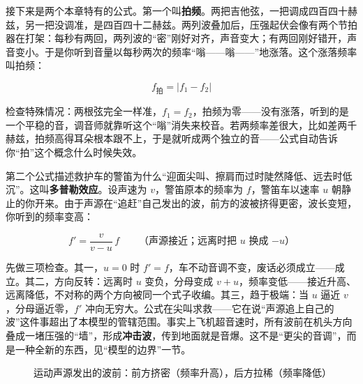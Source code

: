 \begin{mainline}
接下来是两个本章特有的公式。第一个叫\textbf{拍频}。两把吉他弦，一把调成四百四十赫兹，另一把没调准，是四百四十二赫兹。两列波叠加后，压强起伏会像有两个节拍器在打架：每秒有两回，两列波的“密”刚好对齐，声音变大；有两回刚好错开，声音变小。于是你听到音量以每秒两次的频率“嗡——嗡——”地涨落。这个涨落频率叫拍频：

\[
  f_{\text{拍}} = \lvert f_1 - f_2 \rvert
\]

检查特殊情况：两根弦完全一样准，\(f_1=f_2\)，拍频为零——没有涨落，听到的是一个平稳的音，调音师就靠听这个“嗡”消失来校音。若两频率差很大，比如差两千赫兹，拍频高得耳朵根本跟不上，于是就听成两个独立的音——公式自动告诉你“拍”这个概念什么时候失效。

第二个公式描述救护车的警笛为什么“迎面尖叫、擦肩而过时陡然降低、远去时低沉”。这叫\textbf{多普勒效应}。设声速为 \(v\)，警笛原本的频率为 \(f\)，警笛车以速率 \(u\) 朝静止的你开来。由于声源在“追赶”自己发出的波，前方的波被挤得更密，波长变短，你听到的频率变高：

\[
  f' = \frac{v}{v-u}\,f
  \qquad\text{（声源接近；远离时把 \(u\) 换成 \(-u\)）}
\]

先做三项检查。其一，\(u=0\) 时 \(f'=f\)，车不动音调不变，废话必须成立——成立。其二，方向反转：远离时 \(u\) 变负，分母变成 \(v+u\)，频率变低——接近升高、远离降低，不对称的两个方向被同一个式子收编。其三，趋于极端：当 \(u\) 逼近 \(v\)，分母逼近零，\(f'\) 冲向无穷大。公式在尖叫求救——它在说“声源追上自己的波”这件事超出了本模型的管辖范围。事实上飞机超音速时，所有波前在机头方向叠成一堵压强的“墙”，形成\textbf{冲击波}，传到地面就是音爆。这不是“更尖的音调”，而是一种全新的东西，见“模型的边界”一节。
\end{mainline}

\begin{figure}[htbp]
\centering
{}
\caption{运动声源发出的波前：前方挤密（频率升高），后方拉稀（频率降低）}
\end{figure}


